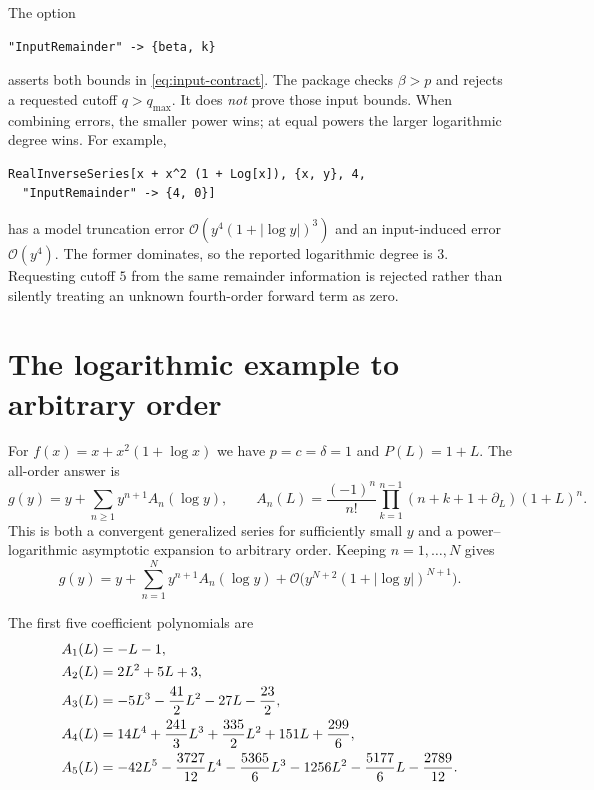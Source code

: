 \documentclass[11pt,a4paper]{article}
\numberwithin{equation}{section}
\theoremstyle{definition}
\newcommand{\OO}{\mathcal O}
\newcommand{\DL}{\partial_L}
\begin{document}
The option
\begin{lstlisting}
"InputRemainder" -> {beta, k}
\end{lstlisting}
asserts both bounds in \eqref{eq:input-contract}. The package checks
$\beta>p$ and rejects a requested cutoff $q>q_{\max}$. It does \emph{not}
prove those input bounds. When combining errors, the smaller power wins;
at equal powers the larger logarithmic degree wins. For example,
\begin{lstlisting}
RealInverseSeries[x + x^2 (1 + Log[x]), {x, y}, 4,
  "InputRemainder" -> {4, 0}]
\end{lstlisting}
has a model truncation error $\OO(y^4(1+|\log y|)^3)$ and an input-induced
error $\OO(y^4)$. The former dominates, so the reported logarithmic degree
is $3$. Requesting cutoff $5$ from the same remainder information is
rejected rather than silently treating an unknown fourth-order forward
term as zero.

\section{The logarithmic example to arbitrary order}
\label{sec:log-example}

For $f(x)=x+x^2(1+\log x)$ we have $p=c=\delta=1$ and $P(L)=1+L$.
The all-order answer is
\begin{equation}\label{eq:log-all}
 g(y)=y+\sum_{n\ge1}y^{n+1}A_n(\log y),\qquad
 A_n(L)=\frac{(-1)^n}{n!}
       \prod_{k=1}^{n-1}(n+k+1+\DL)(1+L)^n.
\end{equation}
This is both a convergent generalized series for sufficiently small $y$
and a power--logarithmic asymptotic expansion to arbitrary order. Keeping
$n=1,\ldots,N$ gives
\begin{equation}\label{eq:log-tail}
 g(y)=y+\sum_{n=1}^N y^{n+1}A_n(\log y)
 +\OO\bigl(y^{N+2}(1+|\log y|)^{N+1}\bigr).
\end{equation}

The first five coefficient polynomials are
\begin{align}
 A_1(L)&=-L-1,\notag\\
 A_2(L)&=2L^2+5L+3,\notag\\
 A_3(L)&=-5L^3-\frac{41}{2}L^2-27L-\frac{23}{2},\notag\\
 A_4(L)&=14L^4+\frac{241}{3}L^3+\frac{335}{2}L^2
                       +151L+\frac{299}{6},\notag\\
 A_5(L)&=-42L^5-\frac{3727}{12}L^4-\frac{5365}{6}L^3
             -1256L^2-\frac{5177}{6}L-\frac{2789}{12}.
 \label{eq:log-polys}
\end{align}
\end{document}
